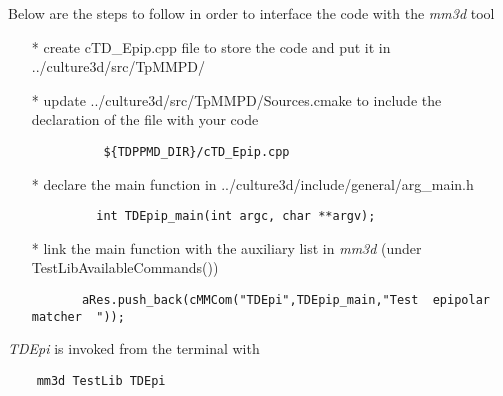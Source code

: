 


\noindent Below are the steps to follow in order to interface the code with the \emph{mm3d} tool
\begin{itemize}
  \item[*] create cTD\_Epip.cpp file to store the code and put it in ../culture3d/src/TpMMPD/ 
    
  \item[*] update ../culture3d/src/TpMMPD/Sources.cmake to include the declaration of the file with your code 
    \begin{lstlisting}
          ${TDPPMD_DIR}/cTD_Epip.cpp    
       \end{lstlisting}
  \item[*] declare the main function in ../culture3d/include/general/arg\_main.h
       \begin{lstlisting}
         int TDEpip_main(int argc, char **argv);    
       \end{lstlisting}
     \item[*] link the main function with the auxiliary list in \emph{mm3d} (under TestLibAvailableCommands())
	\begin{lstlisting}
	   aRes.push_back(cMMCom("TDEpi",TDEpip_main,"Test  epipolar matcher  "));
	\end{lstlisting}
\end{itemize}

\noindent \emph{TDEpi} is invoked from the terminal with
\begin{lstlisting}
	mm3d TestLib TDEpi 
\end{lstlisting}


